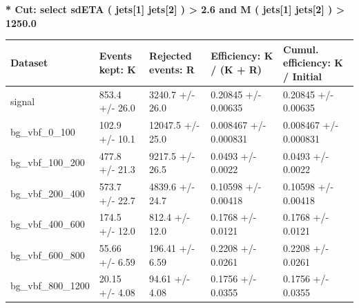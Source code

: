 \documentclass[a4paper, 10pt]{article}
\begin{document}
\textbf{* Cut: select sdETA ( jets[1] jets[2] ) > 2.6 and M ( jets[1] jets[2] ) > 1250.0}\\
   \begin{table}[H]
  \begin{center}
    \begin{tabular}{|m{20.0mm}|m{27.0mm}|m{27.0mm}|m{33.0mm}|m{32.0mm}|}
      \hline
      {\cellcolor{yellow}         Dataset}& {\cellcolor{yellow}         Events kept:
          K}& {\cellcolor{yellow}         Rejected events:
          R}& {\cellcolor{yellow}         Efficiency:
          K /\- (K + R)}& {\cellcolor{yellow}         Cumul. efficiency:
          K /\- Initial}\\
      \hline
      {\cellcolor{white}         signal}& {\cellcolor{white}         853.4 +/\-- 26.0}& {\cellcolor{white}         3240.7 +/\-- 26.0}& {\cellcolor{white}         0.20845 +/\-- 0.00635}& {\cellcolor{white}         0.20845 +/\-- 0.00635}\\
      \hline
      {\cellcolor{white}         bg\_vbf\_0\_100}& {\cellcolor{white}         102.9 +/\-- 10.1}& {\cellcolor{white}         12047.5 +/\-- 25.0}& {\cellcolor{white}         0.008467 +/\-- 0.000831}& {\cellcolor{white}         0.008467 +/\-- 0.000831}\\
      \hline
      {\cellcolor{white}         bg\_vbf\_100\_200}& {\cellcolor{white}         477.8 +/\-- 21.3}& {\cellcolor{white}         9217.5 +/\-- 26.5}& {\cellcolor{white}         0.0493 +/\-- 0.0022}& {\cellcolor{white}         0.0493 +/\-- 0.0022}\\
      \hline
      {\cellcolor{white}         bg\_vbf\_200\_400}& {\cellcolor{white}         573.7 +/\-- 22.7}& {\cellcolor{white}         4839.6 +/\-- 24.7}& {\cellcolor{white}         0.10598 +/\-- 0.00418}& {\cellcolor{white}         0.10598 +/\-- 0.00418}\\
      \hline
      {\cellcolor{white}         bg\_vbf\_400\_600}& {\cellcolor{white}         174.5 +/\-- 12.0}& {\cellcolor{white}         812.4 +/\-- 12.0}& {\cellcolor{white}         0.1768 +/\-- 0.0121}& {\cellcolor{white}         0.1768 +/\-- 0.0121}\\
      \hline
      {\cellcolor{white}         bg\_vbf\_600\_800}& {\cellcolor{white}         55.66 +/\-- 6.59}& {\cellcolor{white}         196.41 +/\-- 6.59}& {\cellcolor{white}         0.2208 +/\-- 0.0261}& {\cellcolor{white}         0.2208 +/\-- 0.0261}\\
      \hline
      {\cellcolor{white}         bg\_vbf\_800\_1200}& {\cellcolor{white}         20.15 +/\-- 4.08}& {\cellcolor{white}         94.61 +/\-- 4.08}& {\cellcolor{white}         0.1756 +/\-- 0.0355}& {\cellcolor{white}         0.1756 +/\-- 0.0355}\\

\end{tabular}
\end{center}
\end{table}
\end{document}
